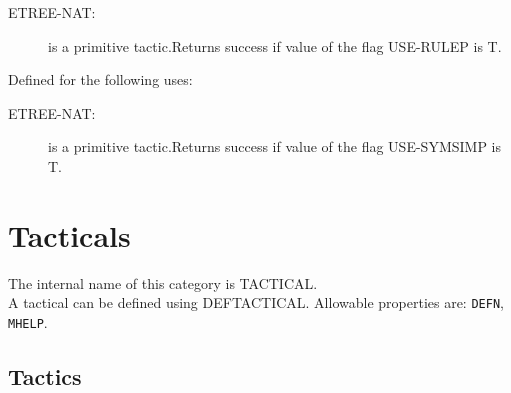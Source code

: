 \begin{description}
\begin{description}
\item[ETREE-NAT:]  is a primitive tactic.Returns success if value of the flag USE-RULEP is T.

\end{description}

\item[USE-SYMSIMP-TAC]  Defined for the following uses:
\begin{description}
\item[ETREE-NAT:]  is a primitive tactic.Returns success if value of the flag USE-SYMSIMP is T.

\end{description}

\item
\end{description}
\chapter{Tacticals}
The internal name of this category is 
TACTICAL.\\
A tactical can be defined using DEFTACTICAL.
Allowable properties are: \texttt{DEFN}, \texttt{MHELP}.

\section{Tactics}

